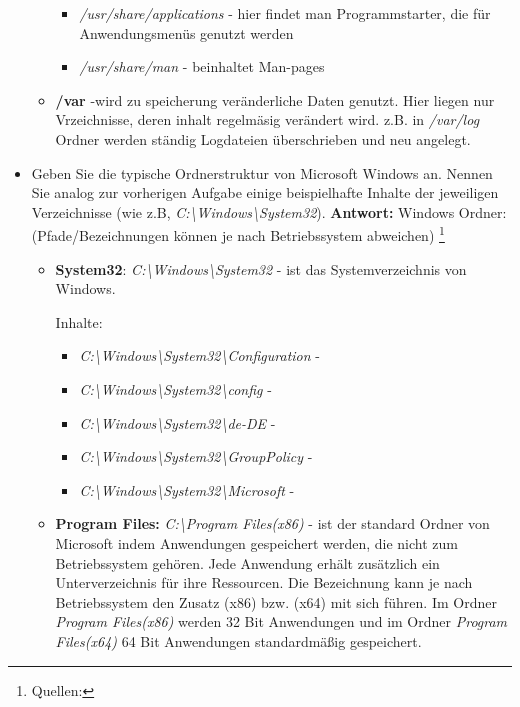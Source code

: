 \begin{itemize}
\begin{itemize}
\begin{itemize}
				\item \textit{/usr/share/applications} - hier findet man Programmstarter, die für Anwendungsmenüs genutzt werden
				\item \textit{/usr/share/man} - beinhaltet Man-pages
			\end{itemize}
			\item \textbf{/var } -wird zu speicherung veränderliche Daten genutzt. Hier liegen nur Vrzeichnisse,
			deren inhalt regelmäsig verändert wird.
			z.B. in \textit{/var/log} Ordner werden ständig Logdateien überschrieben und neu angelegt.


		\end{itemize}
\item Geben Sie die typische Ordnerstruktur von Microsoft Windows an. Nennen Sie analog
zur vorherigen Aufgabe einige beispielhafte Inhalte der jeweiligen Verzeichnisse (wie z.B,
\textit{C:\textbackslash Windows\textbackslash System32}).
\textbf{Antwort:} Windows Ordner: (Pfade/Bezeichnungen können je nach Betriebssystem abweichen)
\footnote{Quellen:}
\begin{itemize}
	\item \textbf{System32}:	\textit{C:\textbackslash Windows\textbackslash System32} - ist das Systemverzeichnis von Windows.

	Inhalte:
	\begin{itemize}
		\item \textit{C:\textbackslash Windows\textbackslash System32\textbackslash Configuration} -
		\item \textit{C:\textbackslash Windows\textbackslash System32\textbackslash config} -
		\item \textit{C:\textbackslash Windows\textbackslash System32\textbackslash de-DE} -
		\item \textit{C:\textbackslash Windows\textbackslash System32\textbackslash GroupPolicy} -
		\item \textit{C:\textbackslash Windows\textbackslash System32\textbackslash Microsoft} -
\end{itemize}
 \item \textbf{Program Files:}	 \textit{C:\textbackslash Program Files(x86)} -
	ist der standard Ordner von Microsoft indem Anwendungen gespeichert werden, die
	nicht zum Betriebssystem gehören. Jede Anwendung erhält zusätzlich ein Unterverzeichnis für
	ihre Ressourcen. Die Bezeichnung kann je nach Betriebssystem den Zusatz (x86) bzw. (x64) mit
	sich führen. Im Ordner \textit{Program Files(x86)} werden 32 Bit Anwendungen und im Ordner
	\textit{Program Files(x64)} 64 Bit Anwendungen standardmäßig gespeichert.


\end{itemize}
\end{itemize}
